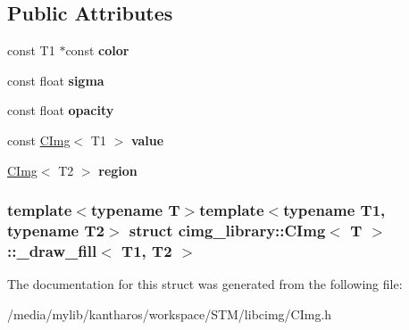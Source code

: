 \subsection*{Public Attributes}
\begin{DoxyCompactItemize}
\item 
\hypertarget{structcimg__library_1_1_c_img_1_1__draw__fill_af8a2367bd9b8f724fbd157fb148ad462}{
const T1 $\ast$const {\bfseries color}}
\label{structcimg__library_1_1_c_img_1_1__draw__fill_af8a2367bd9b8f724fbd157fb148ad462}

\item 
\hypertarget{structcimg__library_1_1_c_img_1_1__draw__fill_a2ac010c7d857c78147c4aaa1cb0f90ec}{
const float {\bfseries sigma}}
\label{structcimg__library_1_1_c_img_1_1__draw__fill_a2ac010c7d857c78147c4aaa1cb0f90ec}

\item 
\hypertarget{structcimg__library_1_1_c_img_1_1__draw__fill_a11f9740419d41eebdc13cefa146ca03a}{
const float {\bfseries opacity}}
\label{structcimg__library_1_1_c_img_1_1__draw__fill_a11f9740419d41eebdc13cefa146ca03a}

\item 
\hypertarget{structcimg__library_1_1_c_img_1_1__draw__fill_aafa22e94b90b12df29f56c5d4e9513ff}{
const \hyperlink{structcimg__library_1_1_c_img}{CImg}$<$ T1 $>$ {\bfseries value}}
\label{structcimg__library_1_1_c_img_1_1__draw__fill_aafa22e94b90b12df29f56c5d4e9513ff}

\item 
\hypertarget{structcimg__library_1_1_c_img_1_1__draw__fill_a613f2bc6a944b21dc7f77dffa7e7c93a}{
\hyperlink{structcimg__library_1_1_c_img}{CImg}$<$ T2 $>$ {\bfseries region}}
\label{structcimg__library_1_1_c_img_1_1__draw__fill_a613f2bc6a944b21dc7f77dffa7e7c93a}

\end{DoxyCompactItemize}
\subsubsection*{template$<$typename T$>$template$<$typename T1, typename T2$>$ struct cimg\_\-library::CImg$<$ T $>$::\_\-draw\_\-fill$<$ T1, T2 $>$}



The documentation for this struct was generated from the following file:\begin{DoxyCompactItemize}
\item 
/media/mylib/kantharos/workspace/STM/libcimg/CImg.h\end{DoxyCompactItemize}
